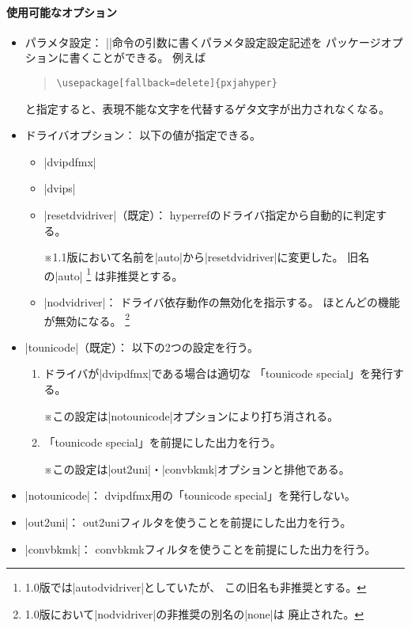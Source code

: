 \documentclass[uplatex,dvipdfmx,a4paper]{jsarticle}
\renewcommand{\headfont}{\gtfamily\romanseries{sbc}\sffamily}
\newcommand{\Pkg}[1]{\textsf{#1}}
\newcommand{\Note}{\par\noindent ※}
\newcommand{\Means}{：\quad}
\newcommand{\／}{\mbox{}／\mbox{}}
\providecommand{\Strong}[1]{{\headfont#1}}
\begin{document}
\paragraph{使用可能なオプション}\mbox{}
\begin{itemize}
\item \Strong{パラメタ設定}\Means
  |\pxjahypersetup|命令の引数に書くパラメタ設定設定記述を
  パッケージオプションに書くことができる。
  例えば
\begin{quote}\small\begin{verbatim}
\usepackage[fallback=delete]{pxjahyper}
\end{verbatim}\end{quote}
  と指定すると、表現不能な文字を代替するゲタ文字が出力されなくなる。
\item \Strong{ドライバオプション}\Means
  以下の値が指定できる。
  \begin{itemize}
  \item |dvipdfmx|
  \item |dvips|
  \item |resetdvidriver|（既定）\Means
    \Pkg{hyperref}のドライバ指定から自動的に判定する。
    \Note 1.1版において名前を|auto|から|resetdvidriver|に変更した。
      旧名の|auto|%
      \footnote{1.0版では|autodvidriver|としていたが、
        この旧名も\Strong{非推奨}とする。}%
      は\Strong{非推奨}とする。
  \item |nodvidriver|\Means
    ドライバ依存動作の無効化を指示する。
    ほとんどの機能が無効になる。
    \footnote{1.0版において|nodvidriver|の非推奨の別名の|none|は
      \Strong{廃止}された。}
  \end{itemize}
\item |tounicode|（既定）\Means
  以下の2つの設定を行う。
  \begin{enumerate}
  \item ドライバが|dvipdfmx|である場合は適切な
    「tounicode special」を発行する。
    \Note この設定は|notounicode|オプションにより打ち消される。
  \item 「tounicode special」を前提にした出力を行う。
    \Note この設定は|out2uni|・|convbkmk|オプションと排他である。
  \end{enumerate}
\item |notounicode|\Means
  dvipdfmx用の「tounicode special」を発行しない。
\item |out2uni|\Means
  out2uniフィルタを使うことを前提にした出力を行う。
\item |convbkmk|\Means
  convbkmkフィルタを使うことを前提にした出力を行う。

\end{itemize}
\end{document}

